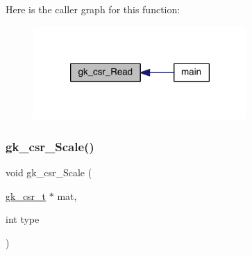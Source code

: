 Here is the caller graph for this function\+:\nopagebreak
\begin{figure}[H]
\begin{center}
\leavevmode
\includegraphics[width=230pt]{a00077_a8ebc19fe9a291bdf67677ebdaae56592_icgraph}
\end{center}
\end{figure}
\mbox{\label{a00077_adf45acdb60028f87304c1edc75baf194}} 
\subsubsection{\texorpdfstring{gk\+\_\+csr\+\_\+\+Scale()}{gk\_csr\_Scale()}}
{\footnotesize\ttfamily void gk\+\_\+csr\+\_\+\+Scale (\begin{DoxyParamCaption}\item[{\hyperlink{a00634}{gk\+\_\+csr\+\_\+t} $\ast$}]{mat,  }\item[{int}]{type }\end{DoxyParamCaption})}

